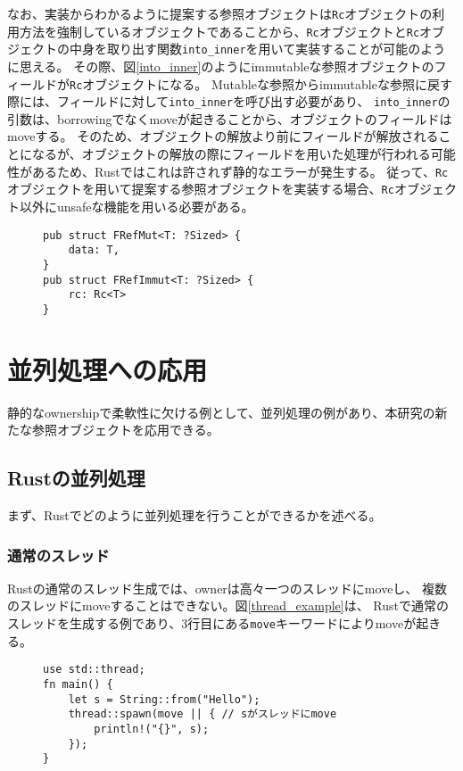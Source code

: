 \documentclass{sumiilab-paper}
\theoremstyle{mystyle}
\numberwithin{definition}{chapter} %
\begin{document}
なお、実装からわかるように提案する参照オブジェクトは\texttt{Rc}オブジェクトの利用方法を強制しているオブジェクトであることから、\texttt{Rc}オブジェクトと\texttt{Rc}オブジェクトの中身を取り出す関数\texttt{into\_inner}を用いて実装することが可能のように思える。
その際、図\ref{into_inner}のようにimmutableな参照オブジェクトのフィールドが\texttt{Rc}オブジェクトになる。
Mutableな参照からimmutableな参照に戻す際には、フィールドに対して\texttt{into\_inner}を呼び出す必要があり、
\texttt{into\_inner}の引数は、borrowingでなくmoveが起きることから、オブジェクトのフィールドはmoveする。
そのため、オブジェクトの解放より前にフィールドが解放されることになるが、オブジェクトの解放の際にフィールドを用いた処理が行われる可能性があるため、Rustではこれは許されず静的なエラーが発生する。
従って、\texttt{Rc}オブジェクトを用いて提案する参照オブジェクトを実装する場合、\texttt{Rc}オブジェクト以外にunsafeな機能を用いる必要がある。

\begin{figure}[htp]
\begin{lstlisting}[caption=Rcオブジェクトと関数into\_innerによる実装の試み, label=into_inner, captionpos=b]
pub struct FRefMut<T: ?Sized> {
    data: T,
}
pub struct FRefImmut<T: ?Sized> {
    rc: Rc<T>
}
\end{lstlisting}
\end{figure}

\chapter{並列処理への応用}
静的なownershipで柔軟性に欠ける例として、並列処理の例があり、本研究の新たな参照オブジェクトを応用できる。

\section{Rustの並列処理}
まず、Rustでどのように並列処理を行うことができるかを述べる。
\subsection{通常のスレッド}
Rustの通常のスレッド生成では、ownerは高々一つのスレッドにmoveし、
複数のスレッドにmoveすることはできない。図\ref{thread_example}は、
Rustで通常のスレッドを生成する例であり、3行目にある\texttt{move}キーワードによりmoveが起きる。
\begin{figure}[htp]
\begin{lstlisting}[caption=Rustでの通常のスレッド生成の例, 
  label=thread_example, captionpos=b]
use std::thread;
fn main() {
    let s = String::from("Hello");
    thread::spawn(move || { // sがスレッドにmove
        println!("{}", s);
    });
}
\end{lstlisting}
\end{figure}
\end{document}
